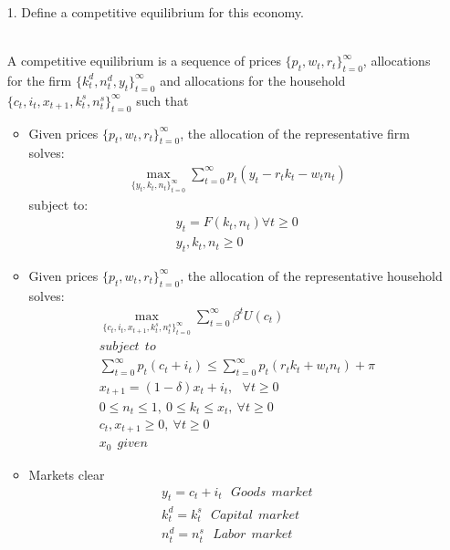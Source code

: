\documentclass[a4paper]{article}
\begin{document}
\begin{enumerate}
\item[1.] Define a competitive equilibrium for this economy.\\~\

A competitive equilibrium is a sequence of prices $\{p_{t},w_{t}, r_{t}\}^{\infty}_{t=0}$, allocations for the firm $\{ k^{d}_{t}, n^{d}_{t}, y_{t} \}^{\infty}_{t=0}$ and allocations for the household $ \{ c_{t}, i_{t}, x_{t+1}, k^{s}_{t}, n^{s}_{t} \}^{\infty}_{t=0}$ such that
\begin{itemize}
\item Given prices $\{p_{t},w_{t}, r_{t}\}^{\infty}_{t=0}$, the allocation of the representative firm solves: 
\begin{align*}
\max_{ \{ y_{t}, k_{t}, n_{t} \}^{\infty}_{t=0} } \sum^{\infty}_{t=0} p_{t}(y_{t}- r_{t}k_{t} - w_{t}n_{t})
\end{align*}
subject to:
\begin{align*}
y_{t} = F(k_{t}, n_{t}) \forall t\geq 0 \\
y_{t},k_{t},n_{t} \geq 0
\end{align*}


\item Given prices $\{p_{t},w_{t}, r_{t}\}^{\infty}_{t=0}$, the allocation of the representative household solves: 
\begin{align*}
\max_{ \{ c_{t}, i_{t}, x_{t+1}, k^{s}_{t}, n^{s}_{t} \}^{\infty}_{t=0}} \sum^{\infty}_{t=0} \beta^{t} U(c_{t}) \\
subject \: \: to \\
\sum^{\infty}_{t=0} p_{t}(c_{t} + i_{t}) \leq \sum^{\infty}_{t=0} p_{t}(r_{t}k_{t} + w_{t}n_{t}) + \pi \\
x_{t+1} = (1-\delta)x_{t} + i_{t}, \: \: \: \forall t \geq 0 \\
0 \leq n_{t} \leq 1, \: 0 \leq k_{t} \leq x_{t}, \: \forall	t \geq 0\\
c_{t}, x_{t+1} \geq 0, \: \forall t \geq 0 \\
x_{0} \: \: given
\end{align*}

\item Markets clear
\begin{align*}
y_{t} = c_{t} + i_{t} \: \: \: Goods \: \: market \\
k^{d}_{t} = k^{s}_{t} \: \: \: Capital \: \: market \\
n^{d}_{t} = n^{s}_{t} \: \: \: Labor \: \: market
\end{align*}
\end{itemize}



\end{enumerate}
\end{document}
